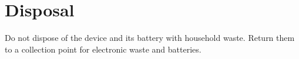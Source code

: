 \section{Disposal}
\label{sec:disposal}
Do not dispose of the device and its battery with household waste. Return them to a collection
point for electronic waste and batteries.
